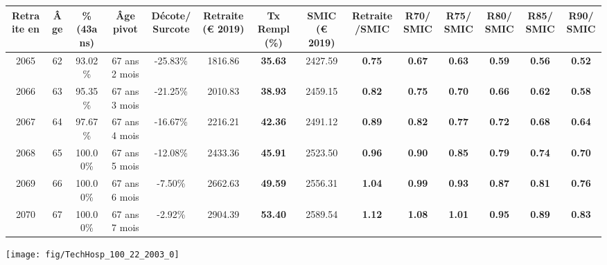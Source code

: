 \begin{adjustbox}{max width=\textwidth} 
\begin{tabular}[htb]{|c|c||c|c|c||c|c||c|c||c|c|c|c|c|} 
\hline 
 Retraite en &  Âge &  \%(43ans) &  Âge pivot &  Décote/Surcote &  Retraite (\euro{} 2019) &  Tx Rempl(\%) &  SMIC (\euro{} 2019) &  Retraite/SMIC &  R70/SMIC &  R75/SMIC &  R80/SMIC &  R85/SMIC &  R90/SMIC \\ 
\hline \hline 
 2065 &  62 &  93.02\% &  67 ans 2 mois &  -25.83\% &  1816.86 &  {\bf 35.63} &  2427.59 &  {\bf {\color{red} 0.75}} &  {\bf {\color{red} 0.67}} &  {\bf {\color{red} 0.63}} &  {\bf {\color{red} 0.59}} &  {\bf {\color{red} 0.56}} &  {\bf {\color{red} 0.52}} \\ 
\hline 
 2066 &  63 &  95.35\% &  67 ans 3 mois &  -21.25\% &  2010.83 &  {\bf 38.93} &  2459.15 &  {\bf {\color{red} 0.82}} &  {\bf {\color{red} 0.75}} &  {\bf {\color{red} 0.70}} &  {\bf {\color{red} 0.66}} &  {\bf {\color{red} 0.62}} &  {\bf {\color{red} 0.58}} \\ 
\hline 
 2067 &  64 &  97.67\% &  67 ans 4 mois &  -16.67\% &  2216.21 &  {\bf 42.36} &  2491.12 &  {\bf {\color{red} 0.89}} &  {\bf {\color{red} 0.82}} &  {\bf {\color{red} 0.77}} &  {\bf {\color{red} 0.72}} &  {\bf {\color{red} 0.68}} &  {\bf {\color{red} 0.64}} \\ 
\hline 
 2068 &  65 &  100.00\% &  67 ans 5 mois &  -12.08\% &  2433.36 &  {\bf 45.91} &  2523.50 &  {\bf {\color{red} 0.96}} &  {\bf {\color{red} 0.90}} &  {\bf {\color{red} 0.85}} &  {\bf {\color{red} 0.79}} &  {\bf {\color{red} 0.74}} &  {\bf {\color{red} 0.70}} \\ 
\hline 
 2069 &  66 &  100.00\% &  67 ans 6 mois &  -7.50\% &  2662.63 &  {\bf 49.59} &  2556.31 &  {\bf 1.04} &  {\bf {\color{red} 0.99}} &  {\bf {\color{red} 0.93}} &  {\bf {\color{red} 0.87}} &  {\bf {\color{red} 0.81}} &  {\bf {\color{red} 0.76}} \\ 
\hline 
 2070 &  67 &  100.00\% &  67 ans 7 mois &  -2.92\% &  2904.39 &  {\bf 53.40} &  2589.54 &  {\bf 1.12} &  {\bf 1.08} &  {\bf 1.01} &  {\bf {\color{red} 0.95}} &  {\bf {\color{red} 0.89}} &  {\bf {\color{red} 0.83}} \\ 
\hline 
\hline 
\end{tabular} 
\end{adjustbox} 
 
 \vspace{0.1cm} 

 {\hspace{-2.2cm}\texttt{[image: fig/TechHosp\_100\_22\_2003\_0]}} 

